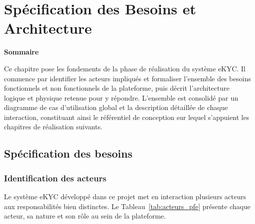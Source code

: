 
\chapter{Spécification des Besoins et Architecture}
\label{chap:specification-architecture}
\vspace{1em}
\noindent\textbf{\large Sommaire}
\vspace{0.5em}
\localtableofcontents
\clearpage

Ce chapitre pose les fondements de la phase de réalisation du système eKYC. Il commence par identifier les acteurs impliqués et formaliser l'ensemble des besoins fonctionnels et non fonctionnels de la plateforme, puis décrit l'architecture logique et physique retenue pour y répondre. L'ensemble est consolidé par un diagramme de cas d'utilisation global et la description détaillée de chaque interaction, constituant ainsi le référentiel de conception sur lequel s'appuient les chapitres de réalisation suivants.

\section{Spécification des besoins}
\label{sec:specification-besoins}

\subsection{Identification des acteurs}
\label{subsec:identification-acteurs}

Le système eKYC développé dans ce projet met en interaction plusieurs acteurs aux responsabilités bien distinctes. Le Tableau~\ref{tab:acteurs_pfe} présente chaque acteur, sa nature et son rôle au sein de la plateforme.

